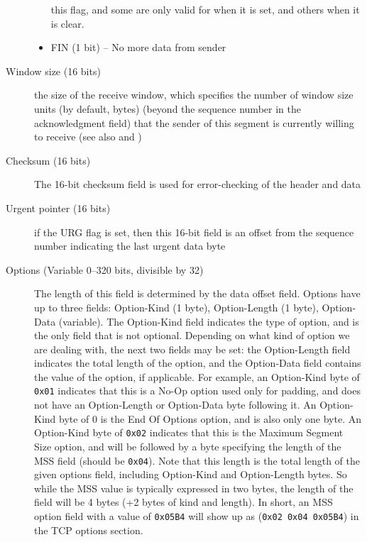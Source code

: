 \begin{description}
\begin{itemize}
    this flag, and some are only valid for when it is set, and others when it is clear.
  \item FIN (1 bit) – No more data from sender
  \end{itemize}
\item[Window size (16 bits)] the size of the receive window, which specifies the number of
  window size units (by default, bytes) (beyond the sequence number in the acknowledgment
  field) that the sender of this segment is currently willing to receive (see also
   and )
\item[Checksum (16 bits)] The 16-bit checksum field is used for error-checking of the
  header and data
\item[Urgent pointer (16 bits)] if the URG flag is set, then this 16-bit field is an
  offset from the sequence number indicating the last urgent data byte
\item[Options (Variable 0–320 bits, divisible by 32)] The length of this field is
  determined by the data offset field. Options have up to three fields: Option-Kind (1
  byte), Option-Length (1 byte), Option-Data (variable). The Option-Kind field indicates
  the type of option, and is the only field that is not optional. Depending on what kind
  of option we are dealing with, the next two fields may be set: the Option-Length field
  indicates the total length of the option, and the Option-Data field contains the value
  of the option, if applicable. For example, an Option-Kind byte of \texttt{0x01}
  indicates that this is a No-Op option used only for padding, and does not have an
  Option-Length or Option-Data byte following it. An Option-Kind byte of 0 is the End Of
  Options option, and is also only one byte. An Option-Kind byte of \texttt{0x02} indicates that
  this is the Maximum Segment Size option, and will be followed by a byte specifying the
  length of the MSS field (should be \texttt{0x04}). Note that this length is the total length of
  the given options field, including Option-Kind and Option-Length bytes. So while the MSS
  value is typically expressed in two bytes, the length of the field will be 4 bytes (+2
  bytes of kind and length). In short, an MSS option field with a value of \texttt{0x05B4} will
  show up as (\texttt{0x02 0x04 0x05B4}) in the TCP options section.
    

\end{description}

